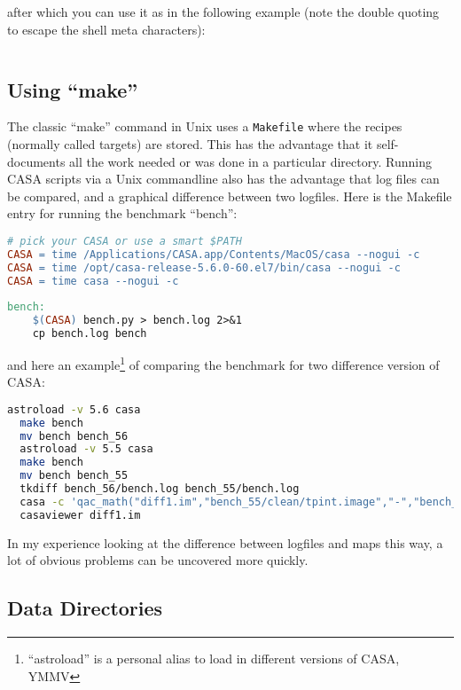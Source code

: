 \documentclass[12pt,a4paper]{article}
\begin{document}
after which you can use it as in the following example (note the
double quoting to escape the shell meta characters):

\begin{lstlisting}[language=bash]
  % casa --nogui -c foo.py pdir='"test1"' imsize=1024 pixel=0.1 niter='[0,1000]'  >foo.log 2>&1
\end{lstlisting}

\subsection{Using ``make''}

The classic ``make'' command in Unix uses a \verb+Makefile+ where the
recipes (normally called targets) are stored. This has the advantage
that it self-documents all the work needed or was done in a particular
directory. Running CASA scripts via a Unix commandline also has the
advantage that log files can be compared, and a graphical difference
between two logfiles.  Here is the Makefile entry for running the
benchmark ``bench'':

\begin{lstlisting}[language=make]
  # pick your CASA or use a smart $PATH
CASA = time /Applications/CASA.app/Contents/MacOS/casa --nogui -c
CASA = time /opt/casa-release-5.6.0-60.el7/bin/casa --nogui -c
CASA = time casa --nogui -c
  
bench:
    $(CASA) bench.py > bench.log 2>&1
    cp bench.log bench
\end{lstlisting}

and here an example\footnote{``astroload'' is a personal alias to load in different versions of CASA, YMMV} of comparing the
benchmark for two difference version of CASA:

\begin{lstlisting}[language=bash]
  astroload -v 5.6 casa
  make bench
  mv bench bench_56
  astroload -v 5.5 casa
  make bench
  mv bench bench_55
  tkdiff bench_56/bench.log bench_55/bench.log
  casa -c 'qac_math("diff1.im","bench_55/clean/tpint.image","-","bench_56/clean/tpint.image")'
  casaviewer diff1.im
\end{lstlisting}

In my experience looking at the difference between logfiles and maps this way, a lot of obvious problems can be uncovered more quickly.

\subsection{Data Directories}
\end{document}
